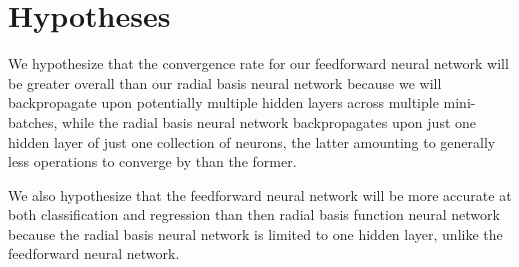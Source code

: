\documentclass[twoside,11pt]{article}
\begin{document}






\section{Hypotheses}
We hypothesize that the convergence rate for our feedforward neural network will be greater overall than our radial basis neural network because we will backpropagate upon potentially multiple hidden layers across multiple mini-batches, while the radial basis neural network backpropagates upon just one hidden layer of just one collection of neurons, the latter amounting to generally less operations to converge by than the former.

We also hypothesize that the feedforward neural network will be more accurate at both classification and regression than then radial basis function neural network because the radial basis neural network is limited to one hidden layer, unlike the feedforward neural network.

\end{document}
